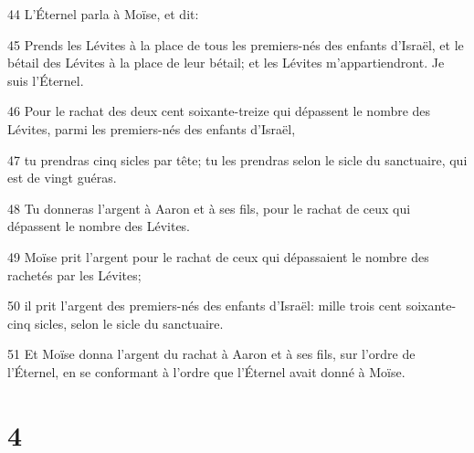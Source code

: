 \par 44 L'Éternel parla à Moïse, et dit:
\par 45 Prends les Lévites à la place de tous les premiers-nés des enfants d'Israël, et le bétail des Lévites à la place de leur bétail; et les Lévites m'appartiendront. Je suis l'Éternel.
\par 46 Pour le rachat des deux cent soixante-treize qui dépassent le nombre des Lévites, parmi les premiers-nés des enfants d'Israël,
\par 47 tu prendras cinq sicles par tête; tu les prendras selon le sicle du sanctuaire, qui est de vingt guéras.
\par 48 Tu donneras l'argent à Aaron et à ses fils, pour le rachat de ceux qui dépassent le nombre des Lévites.
\par 49 Moïse prit l'argent pour le rachat de ceux qui dépassaient le nombre des rachetés par les Lévites;
\par 50 il prit l'argent des premiers-nés des enfants d'Israël: mille trois cent soixante-cinq sicles, selon le sicle du sanctuaire.
\par 51 Et Moïse donna l'argent du rachat à Aaron et à ses fils, sur l'ordre de l'Éternel, en se conformant à l'ordre que l'Éternel avait donné à Moïse.

\chapter{4}

